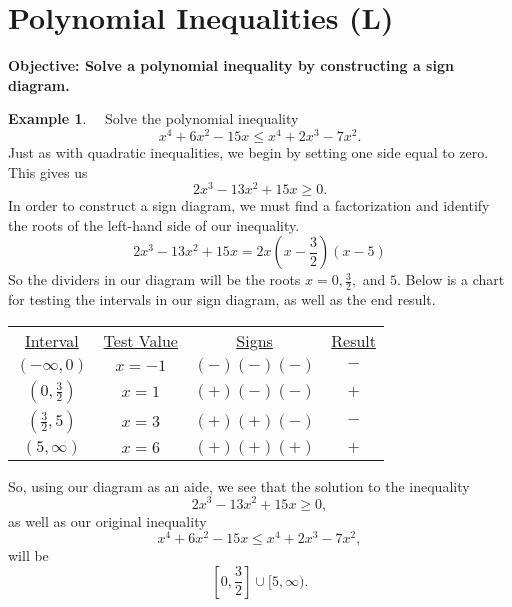 \documentclass[12pt]{book}
\theoremstyle{definition}
\newtheorem{example}{Example}
\begin{document}
\section{Polynomial Inequalities (L)}
{\bf Objective: Solve a polynomial inequality by constructing a sign diagram.}\par
\begin{example}~~Solve the polynomial inequality
$$x^4+6x^2-15x\leq x^4+2x^3-7x^2.$$
Just as with quadratic inequalities, we begin by setting one side equal to zero.  This gives us $$2x^3-13x^2+15x\geq 0.$$
In order to construct a sign diagram, we must find a factorization and identify the roots of the left-hand side of our inequality.
$$2x^3-13x^2+15x=2x\left(x-\dfrac{3}{2}\right)(x-5)$$
So the dividers in our diagram will be the roots $x=0,\frac{3}{2},$ and $5$.  Below is a chart for testing the intervals in our sign diagram, as well as the end result.
\begin{center}
\begin{tabular}{cccc}
\underline{Interval} & \underline{Test Value} & \underline{Signs} & \underline{Result}\\
$(-\infty,0)$ & $x=-1$ & $(-)(-)(-)$ & $-$\\
$(0,\frac{3}{2})$ & $x=1$ & $(+)(-)(-)$ & $+$\\
$(\frac{3}{2},5)$ & $x=3$ & $(+)(+)(-)$ & $-$\\
$(5,\infty)$ &  $x=6$ & $(+)(+)(+)$ & $+$
\end{tabular}
\end{center}
\begin{center}
\end{center}
So, using our diagram as an aide, we see that the solution to the inequality $$2x^3-13x^2+15x\geq 0,$$
as well as our original inequality
$$x^4+6x^2-15x\leq x^4+2x^3-7x^2,$$
will be $$\left[0,\frac{3}{2}\right]\cup[5,\infty).$$

\end{example}
\end{document}
